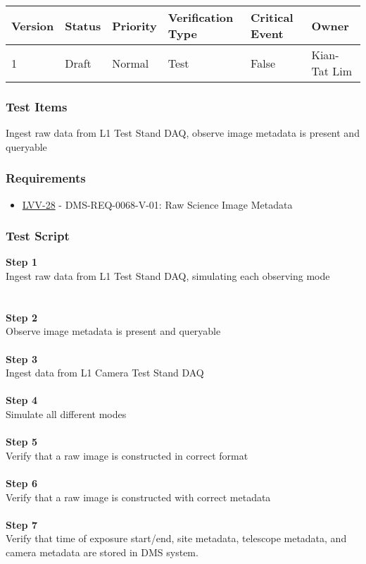 \begin{longtable}[]{@{}llllll@{}}
\toprule
Version & Status & Priority & Verification Type & Critical Event &
Owner\tabularnewline
\midrule
\endhead
1 & Draft & Normal & Test & False & Kian-Tat Lim\tabularnewline
\bottomrule
\end{longtable}

\hypertarget{test-items-122}{%
\subsubsection{Test Items}\label{test-items-122}}

Ingest raw data from L1 Test Stand DAQ, observe image metadata is
present and queryable

\hypertarget{requirements-123}{%
\subsubsection{Requirements}\label{requirements-123}}

\begin{itemize}
\tightlist
\item
  \href{https://jira.lsstcorp.org/browse/LVV-28}{LVV-28} -
  DMS-REQ-0068-V-01: Raw Science Image Metadata
\end{itemize}

\hypertarget{test-script-123}{%
\subsubsection{Test Script}\label{test-script-123}}

\textbf{Step 1}\\
{Ingest raw data from L1 Test Stand DAQ, simulating each observing
mode\\
}~\\
~\\
\textbf{Step 2}\\
O{bserve image metadata is present and queryable}\\
~\\
\textbf{Step 3}\\
Ingest data from L1 Camera Test Stand DAQ\\
~\\
\textbf{Step 4}\\
Simulate all different modes\\
~\\
\textbf{Step 5}\\
Verify that a raw image is constructed in correct format\\
~\\
\textbf{Step 6}\\
Verify that a raw image is constructed with correct metadata\\
~\\
\textbf{Step 7}\\
Verify that time of exposure start/end, site metadata, telescope
metadata, and camera metadata are stored in DMS system.\\
~\\
~\\
~\\

